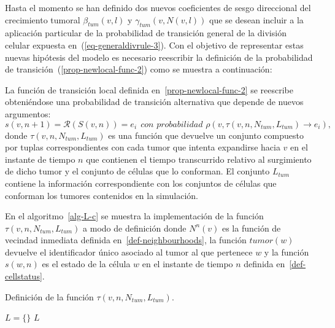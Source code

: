 Hasta el momento se han definido dos nuevos coeficientes de sesgo direccional del crecimiento tumoral $\beta_{tum}(v,l)$ y $\gamma_{tum}(v,N(v,l))$ que se desean incluir a la aplicaci\'on particular de la probabilidad de transici\'on general de la divisi\'on celular expuesta en~(\ref{eq-generaldivrule-3}). Con el objetivo de representar estas nuevas hip\'otesis del modelo es necesario reescribir la definici\'on de la probabilidad de transici\'on~(\ref{prop-newlocal-func-2}) como se muestra a continuaci\'on:

\begin{definition}
\label{prop-newlocal-func-2-1}
La funci\'on de transici\'on local definida en~\ref{prop-newlocal-func-2} se reescribe obteni\'endose una probabilidad de transici\'on alternativa que depende de nuevos argumentos:
\begin{equation}
s(v,n+1) = \mathcal{R}(S(v,n)) = e_i~~\textit{con probabilidad } \rho(v,\tau(v,n,N_{tum},L_{tum}) \rightarrow e_i), \label{eq-newlocal-func-2-1}
\end{equation}
donde $\tau(v,n,N_{tum},L_{tum})$ es una funci\'on que devuelve un conjunto compuesto por tuplas correspondientes con cada tumor que intenta expandirse hacia $v$ en el instante de tiempo $n$ que contienen el tiempo transcurrido relativo al surgimiento de dicho tumor y el conjunto de c\'elulas que lo conforman. El conjunto $L_{tum}$ contiene la informaci\'on correspondiente con los conjuntos de c\'elulas que conforman los tumores contenidos en la simulaci\'on.
\end{definition}

En el algoritmo~\ref{alg-L-c} se muestra la implementaci\'on de la funci\'on $\tau(v,n,N_{tum},L_{tum})$ a modo de definici\'on donde $N^n(v)$ es la funci\'on de vecindad inmediata definida en~\ref{def-neighbourhoods}, la funci\'on $tumor(w)$ devuelve el identificador \'unico asociado al tumor al que pertenece $w$ y la funci\'on $s(w,n)$ es el estado de la c\'elula $w$ en el instante de tiempo $n$ definida en~\ref{def-cellstatus}.

\begin{algorithm}[!ht]
\caption{Definici\'on de la funci\'on $\tau(v,n,N_{tum},L_{tum})$.} \label{alg-L-c}
$L = \lbrace \rbrace$\;
\Return $L$\;
\end{algorithm}

